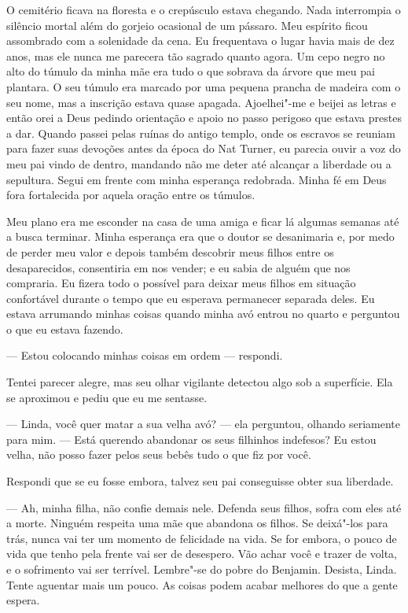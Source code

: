 O cemitério ficava na floresta e o
crepúsculo estava chegando. Nada interrompia o silêncio mortal além do
gorjeio ocasional de um pássaro. Meu espírito ficou assombrado com a
solenidade da cena. Eu frequentava o lugar havia mais de dez anos, mas
ele nunca me parecera tão sagrado quanto agora. Um cepo negro no alto do
túmulo da minha mãe era tudo o que sobrava da árvore que meu pai
plantara. O seu túmulo era marcado por uma pequena prancha de madeira
com o seu nome, mas a inscrição estava quase apagada. Ajoelhei"-me e
beijei as letras e então orei a Deus pedindo orientação e apoio no passo
perigoso que estava prestes a dar. Quando passei pelas ruínas do antigo
templo, onde os escravos se reuniam para fazer suas devoções antes da
época do Nat Turner, eu parecia ouvir a voz do meu pai vindo de dentro,
mandando não me deter até alcançar a liberdade ou a sepultura. Segui em
frente com minha esperança redobrada. Minha fé em Deus fora fortalecida
por aquela oração entre os túmulos.

Meu plano era me esconder na casa de
uma amiga e ficar lá algumas semanas até a busca terminar. Minha
esperança era que o doutor se desanimaria e, por medo de perder meu
valor e depois também descobrir meus filhos entre os desaparecidos,
consentiria em nos vender; e eu sabia de alguém que nos compraria. Eu
fizera todo o possível para deixar meus filhos em situação confortável
durante o tempo que eu esperava permanecer separada deles. Eu estava
arrumando minhas coisas quando minha avó entrou no quarto e perguntou o
que eu estava fazendo.

--- Estou colocando minhas coisas em ordem --- respondi.

Tentei parecer alegre, mas seu olhar vigilante detectou algo sob a
superfície. Ela se aproximou e pediu que eu me sentasse.

--- Linda, você quer matar a sua velha avó? --- ela perguntou, olhando
seriamente para mim. --- Está querendo abandonar os seus filhinhos
indefesos? Eu estou velha, não posso fazer pelos seus bebês tudo o que
fiz por você.

Respondi que se eu fosse embora, talvez
seu pai conseguisse obter sua liberdade.

--- Ah, minha filha, não confie demais
nele. Defenda seus filhos, sofra com eles até a morte. Ninguém respeita
uma mãe que abandona os filhos. Se deixá"-los para trás, nunca vai ter um
momento de felicidade na vida. Se for embora, o pouco de vida que tenho
pela frente vai ser de desespero. Vão achar você e trazer de volta, e o
sofrimento vai ser terrível. Lembre"-se do pobre do Benjamin. Desista,
Linda. Tente aguentar mais um pouco. As coisas podem acabar melhores do
que a gente espera.

